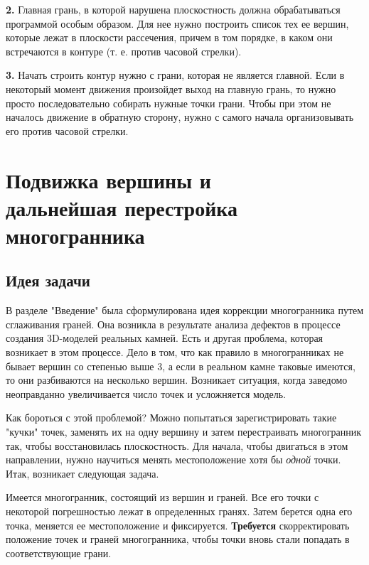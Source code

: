 \documentclass[a4paper,12pt, titlepage]{article}
\begin{document}
\begin{flushleft}
 \textbf{2.} Главная грань, в которой нарушена плоскостность должна обрабатываться программой особым образом.
Для нее нужно построить список тех ее вершин, которые лежат в плоскости рассечения, причем в том порядке, в 
каком они встречаются в контуре (т. е. против часовой стрелки).
\end{flushleft}

\begin{flushleft}
 \textbf{3.} Начать строить контур нужно с грани, которая не является главной. Если в некоторый момент движения
произойдет выход на главную грань, то нужно просто последовательно собирать нужные точки грани. Чтобы при
этом не началось движение в обратную сторону, нужно с самого начала организовывать его против часовой стрелки.
\end{flushleft}




\newpage
\section{Подвижка вершины и \\дальнейшая перестройка многогранника}
\subsection{Идея задачи}
\begin{flushleft}
 В разделе "Введение" была сформулирована идея коррекции многогранника путем сглаживания граней. Она
возникла в результате анализа дефектов в процессе создания 3D-моделей реальных камней. Есть и другая
проблема, которая возникает в этом процессе. Дело в том, что как правило в многогранниках не бывает вершин
со степенью выше 3, а если в реальном камне таковые имеются, то они разбиваются на несколько вершин. 
Возникает ситуация, когда заведомо неоправданно увеличивается число точек и усложняется модель.
\end{flushleft}

\begin{flushleft}
  Как бороться с этой проблемой? Можно попытаться зарегистрировать такие "кучки" точек, заменять их на одну
вершину и затем перестраивать многогранник так, чтобы восстановилась плоскостность. Для начала, чтобы 
двигаться в этом направлении, нужно научиться менять местоположение хотя бы \textit{одной} точки. Итак,
возникает следующая задача.
\end{flushleft}

\begin{flushleft}
  Имеется многогранник, состоящий из вершин и граней. Все его точки с некоторой
погрешностью лежат в определенных гранях. Затем берется одна его точка,
меняется ее местоположение и фиксируется. \textbf{Требуется} скорректировать положение
точек и граней многогранника, чтобы точки вновь стали попадать в соответствующие
грани.
\end{flushleft}
\end{document}
